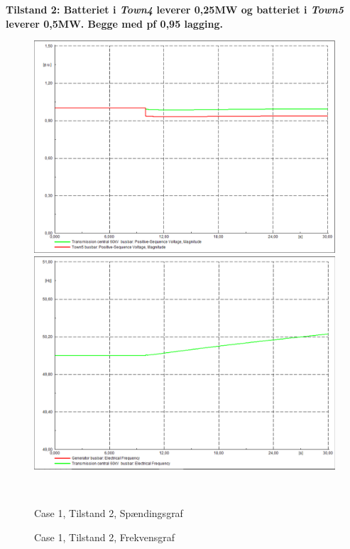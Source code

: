 \newpage
\textbf{Tilstand 2: Batteriet i \textit{Town4} leverer 0,25MW og batteriet i \textit{Town5} leverer 0,5MW. Begge med pf 0,95 lagging.}
\begin{figure}[H]
	\centering
	\begin{minipage}[b]{0.48\textwidth}
		\centering
		\includegraphics[width=1.00\textwidth]{figurer/SmallDisturbance/Voltage2} %
	\end{minipage}
	\hfill
	\begin{minipage}[b]{0.48\textwidth}
		\centering
		\includegraphics[width=1.00\textwidth]{figurer/SmallDisturbance/Freq2} %
	\end{minipage}
	\\ %
	\begin{minipage}[t]{0.48\textwidth}
		\caption{Case 1, Tilstand 2, Spændingsgraf} %
		\label{fig:C1T2V}
	\end{minipage}
	\hfill
	\begin{minipage}[t]{0.48\textwidth}
		\caption{Case 1, Tilstand 2, Frekvensgraf} %
		\label{fig:C1T2F}
	\end{minipage}
\end{figure}

